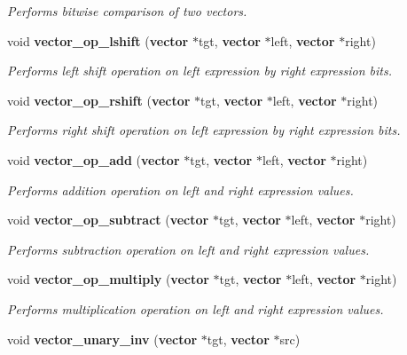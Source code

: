 \begin{CompactItemize}
\begin{CompactList}\small\item\em Performs bitwise comparison of two vectors. \item\end{CompactList}\item 
void {\bf vector\_\-op\_\-lshift} ({\bf vector} $\ast$tgt, {\bf vector} $\ast$left, {\bf vector} $\ast$right)
\begin{CompactList}\small\item\em Performs left shift operation on left expression by right expression bits. \item\end{CompactList}\item 
void {\bf vector\_\-op\_\-rshift} ({\bf vector} $\ast$tgt, {\bf vector} $\ast$left, {\bf vector} $\ast$right)
\begin{CompactList}\small\item\em Performs right shift operation on left expression by right expression bits. \item\end{CompactList}\item 
void {\bf vector\_\-op\_\-add} ({\bf vector} $\ast$tgt, {\bf vector} $\ast$left, {\bf vector} $\ast$right)
\begin{CompactList}\small\item\em Performs addition operation on left and right expression values. \item\end{CompactList}\item 
void {\bf vector\_\-op\_\-subtract} ({\bf vector} $\ast$tgt, {\bf vector} $\ast$left, {\bf vector} $\ast$right)
\begin{CompactList}\small\item\em Performs subtraction operation on left and right expression values. \item\end{CompactList}\item 
void {\bf vector\_\-op\_\-multiply} ({\bf vector} $\ast$tgt, {\bf vector} $\ast$left, {\bf vector} $\ast$right)
\begin{CompactList}\small\item\em Performs multiplication operation on left and right expression values. \item\end{CompactList}\item 
void {\bf vector\_\-unary\_\-inv} ({\bf vector} $\ast$tgt, {\bf vector} $\ast$src)

\end{CompactItemize}
